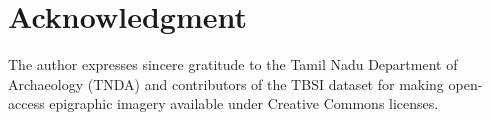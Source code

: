 \documentclass[conference,10pt]{IEEEtran}
\begin{document}
\section*{Acknowledgment}
The author expresses sincere gratitude to the Tamil Nadu Department of Archaeology (TNDA) and contributors of the TBSI dataset for making open-access epigraphic imagery available under Creative Commons licenses.



\end{document}
